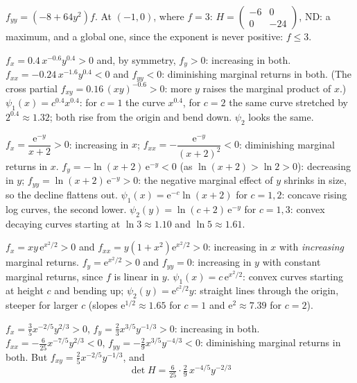 \begin{solutions}
        $f_{yy}=(-8+64y^{2})f$. At $(-1,0)$, where $f=3$:
        $H=\begin{pmatrix}-6&0\\0&-24\end{pmatrix}$, ND: a maximum, and
        a global one, since the exponent is never positive: $f\le3$.
  \item $f_{x}=0.4\,x^{-0.6}y^{0.4}>0$ and, by symmetry, $f_{y}>0$:
        increasing in both. $f_{xx}=-0.24\,x^{-1.6}y^{0.4}<0$ and
        $f_{yy}<0$: diminishing marginal returns in both. (The cross
        partial $f_{xy}=0.16\,(xy)^{-0.6}>0$: more $y$ raises the marginal
        product of $x$.) $\psi_{1}(x)=c^{0.4}x^{0.4}$: for $c=1$ the curve
        $x^{0.4}$, for $c=2$ the same curve stretched by $2^{0.4}\approx1.32$;
        both rise from the origin and bend down. $\psi_{2}$ looks the same.
  \item $f_{x}=\dfrac{\mathrm{e}^{-y}}{x+2}>0$: increasing in $x$;
        $f_{xx}=-\dfrac{\mathrm{e}^{-y}}{(x+2)^{2}}<0$: diminishing marginal
        returns in $x$. $f_{y}=-\ln(x+2)\,\mathrm{e}^{-y}<0$ (as
        $\ln(x+2)>\ln2>0$): decreasing in $y$; $f_{yy}=\ln(x+2)\,
        \mathrm{e}^{-y}>0$: the negative marginal effect of $y$ shrinks in
        size, so the decline flattens out. $\psi_{1}(x)=\mathrm{e}^{-c}
        \ln(x+2)$ for $c=1,2$: concave rising log curves, the second lower.
        $\psi_{2}(y)=\ln(c+2)\,\mathrm{e}^{-y}$ for $c=1,3$: convex decaying
        curves starting at $\ln3\approx1.10$ and $\ln5\approx1.61$.
  \item $f_{x}=xy\,\mathrm{e}^{x^{2}/2}>0$ and
        $f_{xx}=y(1+x^{2})\mathrm{e}^{x^{2}/2}>0$: increasing in $x$ with
        \emph{increasing} marginal returns. $f_{y}=\mathrm{e}^{x^{2}/2}>0$
        and $f_{yy}=0$: increasing in $y$ with constant marginal returns,
        since $f$ is linear in $y$. $\psi_{1}(x)=c\,\mathrm{e}^{x^{2}/2}$:
        convex curves starting at height $c$ and bending up;
        $\psi_{2}(y)=\mathrm{e}^{c^{2}/2}y$: straight lines through the
        origin, steeper for larger $c$ (slopes $\mathrm{e}^{1/2}\approx1.65$
        for $c=1$ and $\mathrm{e}^{2}\approx7.39$ for $c=2$).
  \item $f_{x}=\tfrac35x^{-2/5}y^{2/3}>0$, $f_{y}=\tfrac23x^{3/5}y^{-1/3}>0$:
        increasing in both.
        $f_{xx}=-\tfrac{6}{25}x^{-7/5}y^{2/3}<0$,
        $f_{yy}=-\tfrac29x^{3/5}y^{-4/3}<0$: diminishing marginal returns in
        both. But $f_{xy}=\tfrac25x^{-2/5}y^{-1/3}$, and
        \[
          \det H=\tfrac{6}{25}\cdot\tfrac29\,x^{-4/5}y^{-2/3}
\]
\end{solutions}
